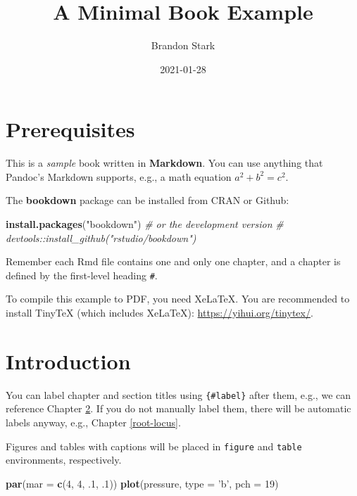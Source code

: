 \documentclass[
]{book}
\title{A Minimal Book Example}
\author{Brandon Stark}
\date{2021-01-28}
\newenvironment{Shaded}{\begin{snugshade}}{\end{snugshade}}
\newcommand{\CommentTok}[1]{\textcolor[rgb]{0.56,0.35,0.01}{\textit{#1}}}
\newcommand{\DataTypeTok}[1]{\textcolor[rgb]{0.13,0.29,0.53}{#1}}
\newcommand{\DecValTok}[1]{\textcolor[rgb]{0.00,0.00,0.81}{#1}}
\newcommand{\FloatTok}[1]{\textcolor[rgb]{0.00,0.00,0.81}{#1}}
\newcommand{\KeywordTok}[1]{\textcolor[rgb]{0.13,0.29,0.53}{\textbf{#1}}}
\newcommand{\NormalTok}[1]{#1}
\newcommand{\StringTok}[1]{\textcolor[rgb]{0.31,0.60,0.02}{#1}}
\theoremstyle{definition}
\theoremstyle{definition}
\theoremstyle{definition}
\theoremstyle{remark}
\begin{document}
\maketitle

{
\setcounter{tocdepth}{1}
\tableofcontents
}
\hypertarget{prerequisites}{%
\chapter{Prerequisites}\label{prerequisites}}

This is a \emph{sample} book written in \textbf{Markdown}. You can use anything that Pandoc's Markdown supports, e.g., a math equation \(a^2 + b^2 = c^2\).

The \textbf{bookdown} package can be installed from CRAN or Github:

\begin{Shaded}
\begin{Highlighting}[]
\KeywordTok{install.packages}\NormalTok{(}\StringTok{"bookdown"}\NormalTok{)}
\CommentTok{# or the development version}
\CommentTok{# devtools::install_github("rstudio/bookdown")}
\end{Highlighting}
\end{Shaded}

Remember each Rmd file contains one and only one chapter, and a chapter is defined by the first-level heading \texttt{\#}.

To compile this example to PDF, you need XeLaTeX. You are recommended to install TinyTeX (which includes XeLaTeX): \url{https://yihui.org/tinytex/}.

\hypertarget{intro}{%
\chapter{Introduction}\label{intro}}

You can label chapter and section titles using \texttt{\{\#label\}} after them, e.g., we can reference Chapter \ref{intro}. If you do not manually label them, there will be automatic labels anyway, e.g., Chapter \ref{root-locus}.

Figures and tables with captions will be placed in \texttt{figure} and \texttt{table} environments, respectively.

\begin{Shaded}
\begin{Highlighting}[]
\KeywordTok{par}\NormalTok{(}\DataTypeTok{mar =} \KeywordTok{c}\NormalTok{(}\DecValTok{4}\NormalTok{, }\DecValTok{4}\NormalTok{, }\FloatTok{.1}\NormalTok{, }\FloatTok{.1}\NormalTok{))}
\KeywordTok{plot}\NormalTok{(pressure, }\DataTypeTok{type =} \StringTok{'b'}\NormalTok{, }\DataTypeTok{pch =} \DecValTok{19}\NormalTok{)}
\end{Highlighting}
\end{Shaded}
\end{document}
